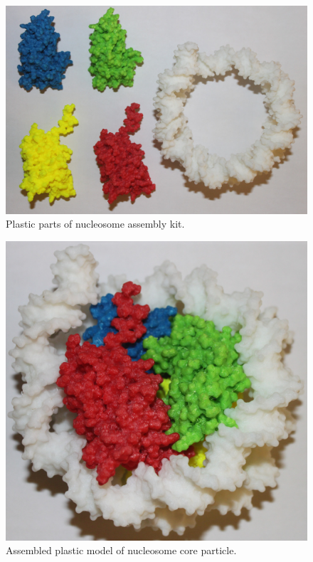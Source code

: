 \documentclass[12pt,onecolumn]{scrartcl}
\begin{document}
\begin{figure}[h]
\begin{center}
\includegraphics[width=1.0\textwidth]{img/nucl_parts} 
\caption{Plastic parts of nucleosome assembly kit.}
\label{parts}
\end{center}
\end{figure}

\begin{figure}[h]
\begin{center}
\includegraphics[width=1.0\textwidth]{img/nucl} 
\caption{Assembled plastic model of nucleosome core particle.}
\label{nucl}
\end{center}
\end{figure}
\end{document}
